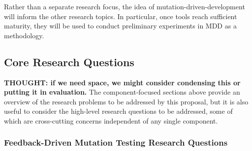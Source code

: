 Rather than a separate research focus, the idea of
mutation-driven-development will inform the other
research topics.  In particular, once tools
reach sufficient maturity, they will be used to conduct preliminary
experiments in MDD as a methodology.  %


\subsection{Core Research Questions}

\textbf{THOUGHT: if we need space, we might consider condensing this or putting
  it in evaluation.}
The component-focused sections above provide an overview of the
research problems to be addressed by this proposal, but it is also
useful to consider the high-level research questions to be addressed,
some of which are cross-cutting concerns independent of any single
component.

\subsubsection{Feedback-Driven Mutation Testing
Research Questions}

